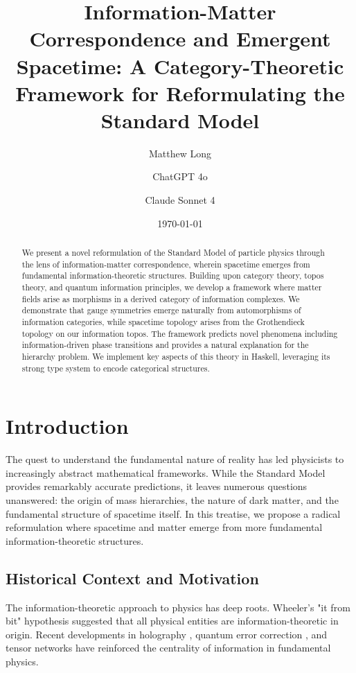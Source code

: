 \documentclass[12pt,a4paper]{article}
\title{Information-Matter Correspondence and Emergent Spacetime: A Category-Theoretic Framework for Reformulating the Standard Model}
\author[1]{Matthew Long}
\author[2]{ChatGPT 4o}
\author[3]{Claude Sonnet 4}
\affil[1]{Yoneda AI}
\affil[2]{OpenAI}
\affil[3]{Anthropic}
\date{\today}
\begin{document}
\maketitle

\begin{abstract}
We present a novel reformulation of the Standard Model of particle physics through the lens of information-matter correspondence, wherein spacetime emerges from fundamental information-theoretic structures. Building upon category theory, topos theory, and quantum information principles, we develop a framework where matter fields arise as morphisms in a derived category of information complexes. We demonstrate that gauge symmetries emerge naturally from automorphisms of information categories, while spacetime topology arises from the Grothendieck topology on our information topos. The framework predicts novel phenomena including information-driven phase transitions and provides a natural explanation for the hierarchy problem. We implement key aspects of this theory in Haskell, leveraging its strong type system to encode categorical structures.
\end{abstract}

\tableofcontents
\newpage

\section{Introduction}

The quest to understand the fundamental nature of reality has led physicists to increasingly abstract mathematical frameworks. While the Standard Model provides remarkably accurate predictions, it leaves numerous questions unanswered: the origin of mass hierarchies, the nature of dark matter, and the fundamental structure of spacetime itself. In this treatise, we propose a radical reformulation where spacetime and matter emerge from more fundamental information-theoretic structures.

\subsection{Historical Context and Motivation}

The information-theoretic approach to physics has deep roots. Wheeler's "it from bit" hypothesis \cite{wheeler1990information} suggested that all physical entities are information-theoretic in origin. Recent developments in holography \cite{susskind1995world}, quantum error correction \cite{almheiri2015bulk}, and tensor networks \cite{swingle2012entanglement} have reinforced the centrality of information in fundamental physics.
\end{document}

